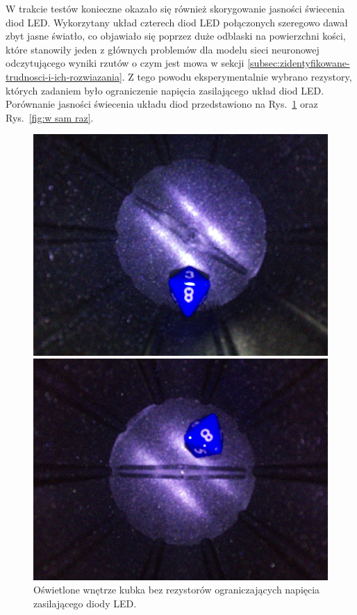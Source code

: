 W trakcie testów konieczne okazało się również skorygowanie jasności świecenia diod LED. Wykorzytany układ czterech diod LED połączonych szeregowo dawał zbyt jasne światło, 
co objawiało się poprzez duże odblaski na powierzchni kości, które stanowiły jeden z głównych problemów dla modelu sieci neuronowej odczytującego wyniki rzutów o czym jest mowa
w sekcji \ref{subsec:zidentyfikowane-trudnosci-i-ich-rozwiazania}. Z tego powodu eksperymentalnie wybrano rezystory, których zadaniem było
ograniczenie napięcia zasilającego układ diod LED. Porównanie jasności świecenia układu diod przedstawiono na Rys.~\ref{fig:za jasno} oraz Rys.~\ref{fig:w sam raz}.

\begin{figure}[H]
    \centering
    \begin{minipage}{0.48\textwidth}
        \centering
        \includegraphics[width=\linewidth]{chapters/03-praca-wlasna/figures/za jasno.jpg}
        \caption{\label{fig:za jasno}Oświetlone wnętrze kubka bez rezystorów ograniczających napięcia zasilającego diody LED.}
    \end{minipage}
    \hfill
    \begin{minipage}{0.48\textwidth}
        \centering
        \includegraphics[width=\linewidth]{chapters/03-praca-wlasna/figures/w sam raz.jpg}

\end{minipage}
\end{figure}
